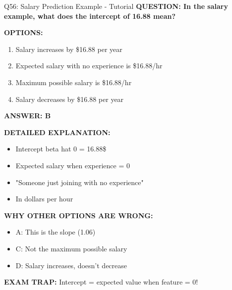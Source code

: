 \documentclass[8pt]{beamer}
\begin{document}
	\begin{frame}{Q56: Salary Prediction Example - Tutorial}
		\fontsize{6.5}{7.5}\selectfont
		\textbf{QUESTION: In the salary example, what does the intercept of 16.88 mean?}
		
		\vspace{0.1cm}
		\textbf{OPTIONS:}
		\begin{enumerate}
			\item Salary increases by \$16.88 per year
			\item Expected salary with no experience is \$16.88/hr
			\item Maximum possible salary is \$16.88/hr
			\item Salary decreases by \$16.88 per year
		\end{enumerate}
		
		\vspace{0.1cm}
		\textcolor{myblue}{\textbf{ANSWER: B}}
		
		\vspace{0.1cm}
		\textbf{DETAILED EXPLANATION:}
		\begin{itemize}
			\item Intercept beta hat 0 = 16.88\$
			\item Expected salary when experience = 0
			\item "Someone just joining with no experience"
			\item In dollars per hour
		\end{itemize}
		
		\vspace{0.1cm}
		\textcolor{myred}{\textbf{WHY OTHER OPTIONS ARE WRONG:}}
		\begin{itemize}
			\item \textcolor{myred}{A:} This is the slope (1.06)
			\item \textcolor{myred}{C:} Not the maximum possible salary
			\item \textcolor{myred}{D:} Salary increases, doesn't decrease
		\end{itemize}
		
		\textcolor{myred}{\textbf{EXAM TRAP:}} Intercept = \textcolor{myblue}{expected value when feature = 0}!
	\end{frame}
	
\end{document}
